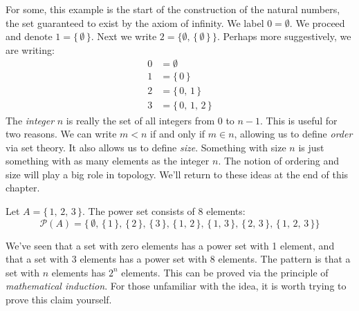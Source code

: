             For some, this example is the start of the construction of the
            natural numbers, the set guaranteed to exist by the axiom of
            infinity. We label $0=\emptyset$. We proceed and denote
            $1=\{\,\emptyset\,\}$. Next we write
            $2=\{\emptyset,\,\{\,\emptyset\,\}\,\}$. Perhaps more suggestively,
            we are writing:
            \begin{align}
                0&=\emptyset\\
                1&=\{\,0\,\}\\
                2&=\{\,0,\,1\,\}\\
                3&=\{\,0,\,1,\,2\,\}
            \end{align}
            The \textit{integer} $n$ is really the set of all integers from $0$
            to $n-1$. This is useful for two reasons. We can write
            $m<n$ if and only if $m\in{n}$, allowing us to define
            \textit{order} via set theory. It also allows us to define
            \textit{size}. Something with size $n$ is just something with as
            many elements as the integer $n$. The notion of ordering and size
            will play a big role in topology. We'll return to these ideas at
            the end of this chapter.
            \begin{example}
                Let $A=\{\,1,\,2,\,3\,\}$. The power set consists of $8$
                elements:
                \begin{equation}
                    \mathcal{P}(A)=\big\{\,\emptyset,\,\{\,1\,\},\,
                        \{\,2\,\},\,\{\,3\,\},\,
                        \{\,1,\,2\,\},\,\{\,1,\,3\,\},\,\{\,2,\,3\,\},\,
                        \{\,1,\,2,\,3\,\}
                    \big\}
                \end{equation}
            \end{example}
            We've seen that a set with zero elements has a power set with 1
            element, and that a set with 3 elements has a power set with 8
            elements. The pattern is that a set with $n$ elements has
            $2^{n}$ elements. This can be proved via the principle of
            \textit{mathematical induction}. For those unfamiliar with the
            idea, it is worth trying to prove this claim yourself.
